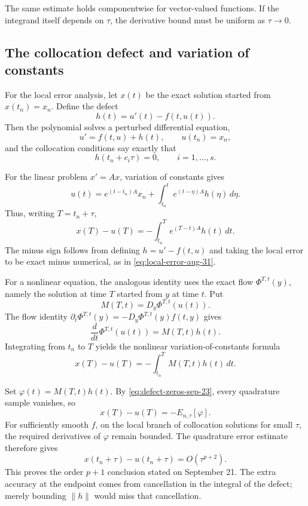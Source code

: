 The same estimate holds componentwise for vector-valued functions.
If the integrand itself depends on \(\tau\), the derivative bound
must be uniform as \(\tau\to0\).

\subsection{The collocation defect and variation of constants}

For the local error analysis, let \(x(t)\) be the exact solution
started from \(x(t_n)=x_n\). Define the defect
\begin{equation}\label{eq:collocation-defect-sep-23}
 h(t)=u'(t)-f(t,u(t)).
\end{equation}
Then the polynomial solves a perturbed differential equation,
\[
 u'=f(t,u)+h(t),\qquad u(t_n)=x_n,
\]
and the collocation conditions say exactly that
\begin{equation}\label{eq:defect-zeros-sep-23}
 h(t_n+c_i\tau)=0,\qquad i=1,\ldots,s.
\end{equation}

For the linear problem \(x'=Ax\), variation of constants gives
\[
 u(t)=e^{(t-t_n)A}x_n+
          \int_{t_n}^t e^{(t-\eta)A}h(\eta)\,d\eta.
\]
Thus, writing \(T=t_n+\tau\),
\begin{equation}\label{eq:linear-defect-error-sep-23}
 x(T)-u(T)=-\int_{t_n}^T e^{(T-t)A}h(t)\,dt.
\end{equation}
The minus sign follows from defining \(h=u'-f(t,u)\) and taking
the local error to be exact minus numerical, as in
\eqref{eq:local-error-aug-31}.

For a nonlinear equation, the analogous identity uses the exact flow
\(\Phi^{T,t}(y)\), namely the solution at time \(T\) started from
\(y\) at time \(t\). Put
\[
 M(T,t)=D_y\Phi^{T,t}(u(t)).
\]
The flow identity
\(\partial_t\Phi^{T,t}(y)=-D_y\Phi^{T,t}(y)f(t,y)\) gives
\[
 \frac{d}{dt}\Phi^{T,t}(u(t))=M(T,t)h(t).
\]
Integrating from \(t_n\) to \(T\) yields the nonlinear
variation-of-constants formula
\begin{equation}\label{eq:nonlinear-defect-error-sep-23}
 x(T)-u(T)=-\int_{t_n}^T M(T,t)h(t)\,dt.
\end{equation}

Set \(\varphi(t)=M(T,t)h(t)\). By
\eqref{eq:defect-zeros-sep-23}, every quadrature sample vanishes, so
\[
 x(T)-u(T)=-E_{n,\tau}[\varphi].
\]
For sufficiently smooth \(f\), on the local branch of collocation
solutions for small \(\tau\), the required derivatives of
\(\varphi\) remain bounded. The quadrature error estimate therefore
gives
\begin{equation}\label{eq:collocation-local-order-sep-23}
 \boxed{x(t_n+\tau)-u(t_n+\tau)=O(\tau^{p+2}).}
\end{equation}
This proves the order \(p+1\) conclusion stated on September 21.
The extra accuracy at the endpoint comes from cancellation in the
integral of the defect; merely bounding \(\|h\|\) would miss that
cancellation.


